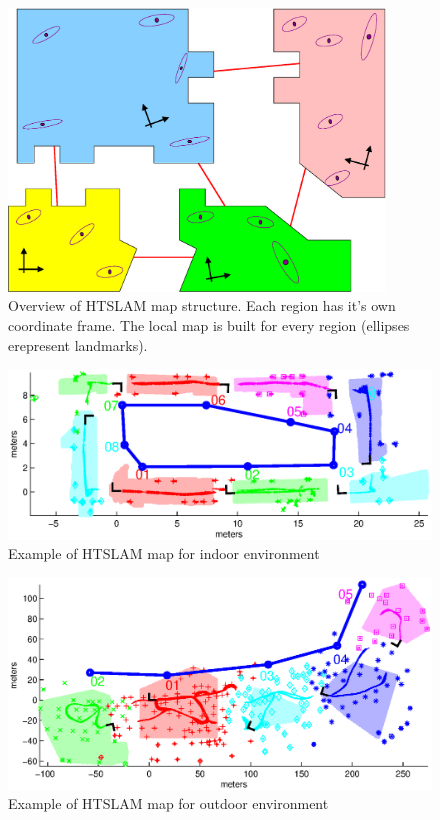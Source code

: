 \begin{figure}
\begin{center}
\includegraphics[width=10cm]{Pics/fig_map_structure}
\end{center}
\caption[Overview of HTSLAM map structure.]
{Overview of HTSLAM map structure. Each region has it's own
coordinate frame. The local map is built for every region (ellipses
erepresent landmarks). }
\label{fig:htslam_structure}
\end{figure}

\begin{figure}
\begin{center}
\includegraphics[width=14cm]{Pics/map_example_indoor}
\end{center}
\caption{Example of HTSLAM map for indoor environment}
\label{fig:htslam_structure_indoor}
\end{figure}


\begin{figure}
\includegraphics[width=14cm]{Pics/map_example_outdoor}
\caption{Example of HTSLAM map for outdoor environment}
\label{fig:htslam_structure_outdoor}
\end{figure}

